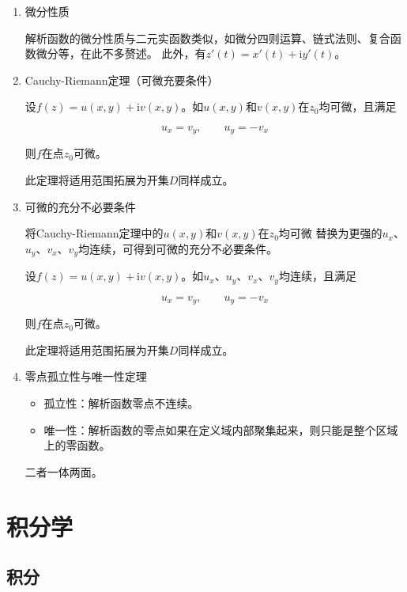 \documentclass[UTF8,fontset=fandol,zihao=5]{ctexart}
\newcommand{\ii}{\mathrm{i}}
\begin{document}
\begin{enumerate}
  
  \item 微分性质
  
  解析函数的微分性质与二元实函数类似，如微分四则运算、链式法则、复合函数微分等，在此不多赘述。
  此外，有$z'(t)=x'(t)+\ii y'(t)$。

  \item Cauchy-Riemann定理（可微充要条件）
  
  设$f(z)=u(x,y)+\ii v(x,y)$。如$u(x,y)$和$v(x,y)$在$z_0$均可微，且满足

  \[
  u_x=v_y, \qquad u_y=-v_x
  \]

  则$f$在点$z_0$可微。

  此定理将适用范围拓展为开集$D$同样成立。

  \item 可微的充分不必要条件
  
  将Cauchy-Riemann定理中的$u(x,y)$和$v(x,y)$在$z_0$均可微
  替换为更强的$u_x$、$u_y$、$v_x$、$v_y$均连续，可得到可微的充分不必要条件。

  设$f(z)=u(x,y)+\ii v(x,y)$。如$u_x$、$u_y$、$v_x$、$v_y$均连续，且满足

  \[
  u_x=v_y, \qquad u_y=-v_x
  \]

  则$f$在点$z_0$可微。

  此定理将适用范围拓展为开集$D$同样成立。

  \item 零点孤立性与唯一性定理
  
  \begin{itemize}
    \item 孤立性：解析函数零点不连续。
    \item 唯一性：解析函数的零点如果在定义域内部聚集起来，则只能是整个区域上的零函数。
  \end{itemize}

  二者一体两面。

\end{enumerate}

\section{积分学}

\subsection{积分}
\end{document}
